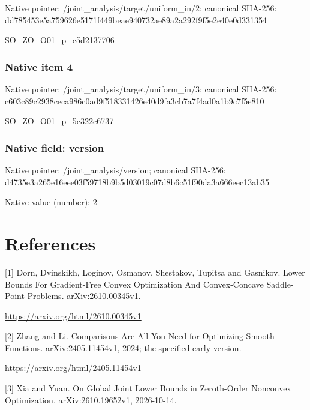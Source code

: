 \documentclass[10pt,a4paper]{article}
\begin{document}
Native pointer: /joint\_analysis/target/uniform\_in/2; canonical SHA-256: dd785453e5a759626e5171f4\allowbreak{}49beae940732ae89a2a292f9\allowbreak{}f5e2e40e0d331354


SO\_ZO\_O01\_p\_c5d2137706


\subsubsection{Native item 4}


Native pointer: /joint\_analysis/target/uniform\_in/3; canonical SHA-256: c603c89c2938ceca986c0ad9\allowbreak{}f518331426e40d9fa3cb7a7f\allowbreak{}4ad0a1b9c7f5e810


SO\_ZO\_O01\_p\_5c322c6737


\subsubsection{Native field: version}


Native pointer: /joint\_analysis/version; canonical SHA-256: d4735e3a265e16eee03f5971\allowbreak{}8b9b5d03019c07d8b6c51f90\allowbreak{}da3a666eec13ab35



Native value (number): 2



\section{References}


[1] Dorn, Dvinskikh, Loginov, Osmanov, Shestakov, Tupitsa and Gasnikov. Lower Bounds For Gradient-Free Convex Optimization And Convex-Concave Saddle-Point Problems. arXiv:2610.00345v1.



\url{https://arxiv.org/html/2610.00345v1}



[2] Zhang and Li. Comparisons Are All You Need for Optimizing Smooth Functions. arXiv:2405.11454v1, 2024; the specified early version.



\url{https://arxiv.org/html/2405.11454v1}



[3] Xia and Yuan. On Global Joint Lower Bounds in Zeroth-Order Nonconvex Optimization. arXiv:2610.19652v1, 2026-10-14.
\end{document}

